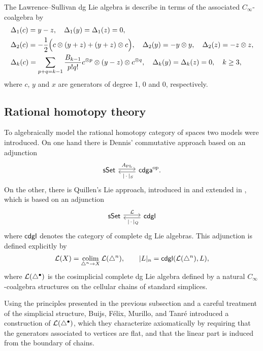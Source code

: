 The Lawrence--Sullivan dg Lie algebra is describe in terms of the associated $C_\infty$-coalgebra by
\begin{align*}
	& \Delta_1(c) = y-z, \quad
	\Delta_1(y) = \Delta_1(z) = 0, \\
	& \Delta_2(c) = -\frac{1}{2} \Big( c \otimes (y+z) + (y+z) \otimes c \Big), \quad
	\Delta_2(y) = -y \otimes y, \quad
	\Delta_2(z) = -z \otimes z, \\
	& \Delta_k(c) = \sum_{p+q=k-1} \frac{B_{k-1}}{p!q!} c^{\otimes p} \otimes (y-z) \otimes c^{\otimes q}, \quad
	\Delta_k(y) = \Delta_k(z) = 0, \quad k \geq 3,
\end{align*}
where $c$, $y$ and $x$ are generators of degree 1, 0 and 0, respectively.

\subsection{Rational homotopy theory} \label{ss:cdgl model}

To algebraically model the rational homotopy category of spaces two models were introduced.
On one hand there is Dennis' commutative approach \cite{sullivan1977infinitesimal} based on an adjunction
\[
\begin{tikzcd}
	\sSet \arrow[r, shift left=2pt, "A_{\mathrm{PL}}"] &
	\cdga^\op \arrow[l, shift left=2pt, "\ \bars{\,\cdot\,}_S"].
\end{tikzcd}
\]
On the other, there is Quillen's Lie approach, introduced in \cite{quillen1969rational} and extended in \cite{buijs2013algebraicmodels, buijs2020liemodels}, which is based on an adjunction
\[
\begin{tikzcd}
	\sSet \arrow[r, shift left=2pt, "\cL"] &
	\cdgl \arrow[l, shift left=2pt, "\ \bars{\,\cdot\,}_Q"]
\end{tikzcd}
\]
where $\mathsf{cdgl}$ denotes the category of complete dg Lie algebras.
This adjunction is defined explicitly by
\[
\mathcal{L}(X) = \operatorname*{colim}_{\triangle^n \to X} \mathcal{L}(\triangle^n), \qquad
\lvert L\rvert_n = \mathsf{cdgl}(\mathcal{L}(\triangle^n), L),
\]
where $\mathcal{L}(\triangle^\bullet)$ is the cosimplicial complete dg Lie algebra defined by a natural $C_\infty$-coalgebra structures on the cellular chains of standard simplices.

Using the principles presented in the previous subsection and a careful treatment of the simplicial structure, Buijs, F{\'e}lix, Murillo, and Tanr{\'e} \cite{buijs2020liemodels} introduced a construction of $\mathcal{L}(\triangle^\bullet)$, which they characterize axiomatically by requiring that the generators associated to vertices are flat, and that the linear part is induced from the boundary of chains.

